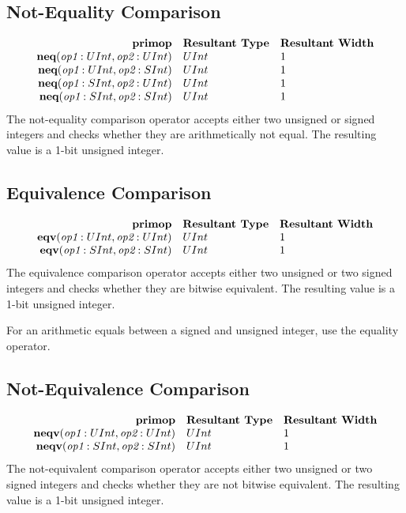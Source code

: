 \documentclass[12pt]{article}
\begin{document}
\subsection{Not-Equality Comparison}
\[
\begin{array}{rll}
\text{\bf primop} & \text{\bf Resultant Type} & \text{\bf Resultant Width} \\
\text{\bf neq}(\text{\em op1}:UInt, \text{\em op2}:UInt)     & UInt & 1 \\
\text{\bf neq}(\text{\em op1}:UInt, \text{\em op2}:SInt)     & UInt & 1 \\
\text{\bf neq}(\text{\em op1}:SInt, \text{\em op2}:UInt)     & UInt & 1 \\
\text{\bf neq}(\text{\em op1}:SInt, \text{\em op2}:SInt)     & UInt & 1 \\
\end{array}
\]
The not-equality comparison operator accepts either two unsigned or signed integers and checks whether they are arithmetically not equal.
The resulting value is a 1-bit unsigned integer. 

\subsection{Equivalence Comparison}
\[
\begin{array}{rll}
\text{\bf primop} & \text{\bf Resultant Type} & \text{\bf Resultant Width} \\
\text{\bf eqv}(\text{\em op1}:UInt, \text{\em op2}:UInt)     & UInt & 1 \\
\text{\bf eqv}(\text{\em op1}:SInt, \text{\em op2}:SInt)     & UInt & 1 \\
\end{array}
\]
The equivalence comparison operator accepts either two unsigned or two signed integers and checks whether they are bitwise equivalent.
The resulting value is a 1-bit unsigned integer. 

For an arithmetic equals between a signed and unsigned integer, use the equality operator.

\subsection{Not-Equivalence Comparison}
\[
\begin{array}{rll}
\text{\bf primop} & \text{\bf Resultant Type} & \text{\bf Resultant Width} \\
\text{\bf neqv}(\text{\em op1}:UInt, \text{\em op2}:UInt)     & UInt & 1 \\
\text{\bf neqv}(\text{\em op1}:SInt, \text{\em op2}:SInt)     & UInt & 1 \\
\end{array}
\]
The not-equivalent comparison operator accepts either two unsigned or two signed integers and checks whether they are not bitwise equivalent.
The resulting value is a 1-bit unsigned integer. 
\end{document}
